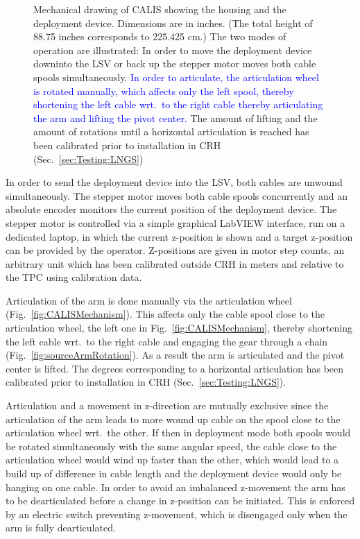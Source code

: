 \begin{figure}[htbp]
 \caption{%
Mechanical drawing of CALIS showing the housing and the deployment device. Dimensions are in inches. (The total height of 88.75 inches corresponds to 225.425 cm.) The two modes of operation are illustrated: In order to move the deployment device downinto the LSV or back up the stepper motor moves both cable spools simultaneously. \textcolor{blue}{In order to articulate, the articulation wheel is rotated manually, which affects only the left spool, thereby shortening the left cable wrt.~to the right cable thereby articulating the arm and lifting the pivot center.} The amount of lifting and the amount of rotations until a horizontal articulation is reached has been calibrated prior to installation in CRH (Sec.~\ref{sec:Testing:LNGS})\label{fig:CALISDimensions}\label{fig:CALISMechanism}\label{fig:gearDrawing}
}
\end{figure}

In order to send the deployment device into the LSV, both cables are unwound simultaneously. The stepper motor moves both cable spools concurrently and an absolute encoder monitors the current position of the deployment device. The stepper motor is controlled via a simple graphical LabVIEW interface, run on a dedicated laptop, in which the current z-position is shown and a target z-position can be provided by the operator. Z-positions are given in motor step counts, an arbitrary unit which has been calibrated outside CRH in meters and relative to the TPC using calibration data.

Articulation of the arm is done manually via the articulation wheel (Fig.~\ref{fig:CALISMechanism}). This affects only the cable spool close to the articulation wheel, the left one in Fig.~\ref{fig:CALISMechanism}, thereby shortening the left cable wrt.~to the right cable and engaging the gear through a chain (Fig.~\ref{fig:sourceArmRotation}). As a result the arm is articulated and the pivot center is lifted. The degrees corresponding to a horizontal articulation has been calibrated prior to installation in CRH (Sec.~\ref{sec:Testing:LNGS}).


Articulation and a movement in z-direction are mutually exclusive since the articulation of the arm leads to more wound up cable on the spool close to the articulation wheel wrt.~the other. If then in deployment mode both spools would be rotated simultaneously with the same angular speed, the cable close to the articulation wheel would wind up faster than the other, which would lead to a build up of difference in cable length and the deployment device would only be hanging on one cable. In order to avoid an imbalanced z-movement the arm has to be dearticulated before a change in z-position can be initiated. This is enforced by an electric switch preventing z-movement, which is disengaged only when the arm is fully dearticulated. 

